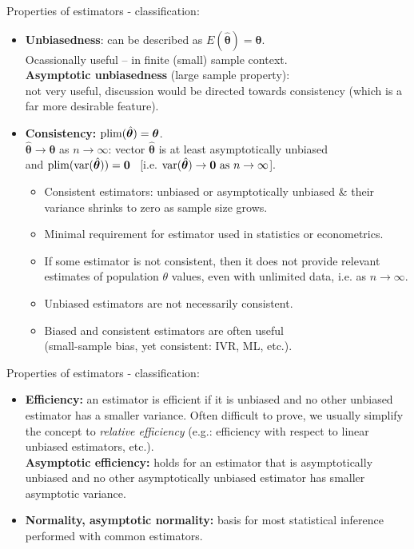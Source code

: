 \documentclass{beamer}
\begin{document}
\begin{frame}{Properties of estimators - classification:}
\small 
\begin{itemize}
\item \textbf{Unbiasedness}: can be described as $E(\hat{\bm{\theta}})= \bm{\theta}$. \\Ocassionally useful -- in finite (small) sample context. \\
\textbf{Asymptotic unbiasedness} (large sample property): \\not very useful, discussion would be directed towards consistency (which is a far more desirable feature).
\medskip
\item \textbf{Consistency:} $\textnormal{plim}(\hat{\bm{\theta}}) = \bm{\theta}$. \\
$\hat{\bm{\theta}} \rightarrow \bm{\theta}$ as $n \rightarrow \infty$: vector $\hat{\bm{\theta}}$ is at least asymptotically unbiased\\and $\textnormal{plim}(\textnormal{var}(\hat{\bm{\theta}}))=\bm{0}$ ~[i.e. $\textnormal{var}(\hat{\bm{\theta}}) \rightarrow \bm{0} \textnormal{ as } n \rightarrow \infty$].
\begin{itemize}
\item Consistent estimators: unbiased or asymptotically unbiased \& their variance shrinks to zero as sample size grows.
\item Minimal requirement for estimator used in statistics or econometrics.
\item If some estimator is not consistent, then it does not provide relevant estimates of population $\theta$ values, even with unlimited data, i.e. as $n \rightarrow \infty$.
\item Unbiased estimators are not necessarily consistent. 
\item Biased and consistent estimators are often useful \\(small-sample bias, yet consistent: IVR, ML, etc.).
\end{itemize}
\end{itemize}
\end{frame}
\begin{frame}{Properties of estimators - classification:}
\medskip
\begin{itemize}
\item \textbf{Efficiency:} an estimator is efficient if it is unbiased and no other unbiased estimator has a smaller variance. Often difficult to prove, we usually simplify the concept to \textit{relative efficiency} (e.g.: efficiency with respect to linear unbiased estimators, etc.).\\ \smallskip \textbf{Asymptotic efficiency:} holds for an estimator that is asymptotically unbiased and no other asymptotically unbiased estimator has smaller asymptotic variance.
\bigskip
\item \textbf{Normality, asymptotic normality:} basis for most statistical inference performed with common estimators. 
\end{itemize}
\end{frame}
\end{document}
